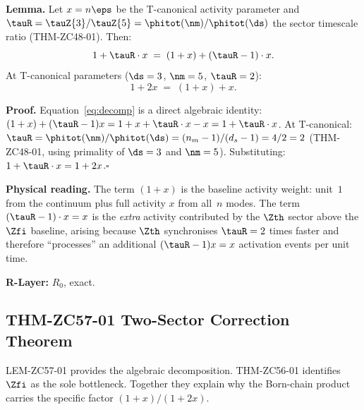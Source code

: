 \documentclass[12pt, a4paper]{article}
\begin{document}
\begin{formalbox}[title={LEM-ZC57-01: Sector Decomposition
  --- $(1+2x)=(1+x)+(\tauR-1)x$ ($R_0$, Exact)}]
\textbf{Lemma.}
Let $x = n\eps$ be the T-canonical activity parameter and
$\tauR = \tauZ{3}/\tauZ{5} = \phitot(\nm)/\phitot(\ds)$
the sector timescale ratio (THM-ZC48-01).
Then:
\begin{equation}
  1 + \tauR\cdot x
  \;=\; (1+x) + (\tauR-1)\cdot x.
  \label{eq:decomp}
\end{equation}
At T-canonical parameters ($\ds=3$, $\nm=5$, $\tauR=2$):
\begin{equation}
  \boxed{1+2x \;=\; (1+x) + x.}
  \label{eq:decomp-tcan}
\end{equation}

\textbf{Proof.}
Equation~\eqref{eq:decomp} is a direct algebraic identity:
$(1+x)+(\tauR-1)x = 1+x+\tauR\cdot x - x = 1+\tauR\cdot x$.
At T-canonical: $\tauR = \phitot(\nm)/\phitot(\ds)
= (n_m-1)/(d_s-1) = 4/2 = 2$ (THM-ZC48-01, using primality
of $\ds=3$ and $\nm=5$).
Substituting: $1+\tauR\cdot x = 1+2x$.\hfill$\square$

\medskip
\textbf{Physical reading.}
The term $(1+x)$ is the baseline activity weight: unit~$1$ from
the continuum plus full activity $x$ from all~$n$ modes.
The term $(\tauR-1)\cdot x = x$ is the \emph{extra} activity
contributed by the $\Zth$ sector above the $\Zfi$ baseline,
arising because $\Zth$ synchronises $\tauR=2$ times faster
and therefore ``processes'' an additional $(\tauR-1)x=x$
activation events per unit time.

\textbf{R-Layer:} $R_0$, exact.
\end{formalbox}

\subsection{THM-ZC57-01 \quad Two-Sector Correction Theorem}
\label{sec:thm01}

LEM-ZC57-01 provides the algebraic decomposition.
THM-ZC56-01 identifies $\Zfi$ as the sole bottleneck.
Together they explain why the Born-chain product carries the
specific factor $(1+x)/(1+2x)$.

\end{document}
